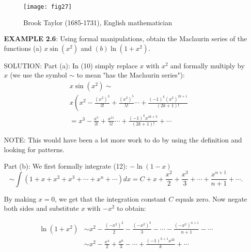 \documentclass[../main.tex]{subfiles}
\begin{document}
\begin{wrapfigure}{l}{0.35\textwidth}
\texttt{[image: fig27]} 
\caption{Brook Taylor (1685-1731), English mathematician \protect\footnotemark[3]}
\label{fig:fig_2_7}
\end{wrapfigure}

\textbf{EXAMPLE 2.6}: Using formal manipulations, obtain the Maclaurin series of the functions (a) $x \sin \left(x^{2}\right)$ and $(b) \ln \left(1+x^{2}\right)$.
 
SOLUTION: Part (a): In (10) simply replace $x$ with $x^{2}$ and formally multiply by $x$ (we use the symbol $\sim$ to mean "has the Maclaurin series"):
$$
\begin{aligned}
&x \sin \left(x^{2}\right) \sim \\
&x\left(x^{2}-\frac{\left(x^{2}\right)^{3}}{3 !}+\frac{\left(x^{2}\right)^{5}}{5 !} \cdots+\frac{(-1)^{k}\left(x^{2}\right)^{2 k+1}}{(2 k+1) !}\right. \\
&=x^{3}-\frac{x^{7}}{3 !}+\frac{x^{11}}{5 !} \cdots+\frac{(-1)^{k} x^{4 k+3}}{(2 k+1) !}+\cdots
\end{aligned}
$$

\noindent NOTE: This would have been a lot more work to do by using the definition and looking for patterns.

Part (b): We first formally integrate (12): $-\ln (1-x)$
$$
\sim \int\left(1+x+x^{2}+x^{3}+\cdots+x^{n}+\cdots\right) d x=C+x+\frac{x^{2}}{2}+\frac{x^{3}}{3}+\cdots+\frac{x^{n+1}}{n+1}+\cdots .
$$

By making $x=0$, we get that the integration constant $C$ equals zero. Now negate both sides and substitute $x$ with $-x^{2}$ to obtain:

$$
\begin{aligned}
\ln \left(1+x^{2}\right) & \sim x^{2}-\frac{\left(-x^{2}\right)^{2}}{2}-\frac{\left(-x^{2}\right)^{3}}{3}-\cdots-\frac{\left(-x^{2}\right)^{n+1}}{n+1}-\cdots \\
& \sim x^{2}-\frac{x^{4}}{2}+\frac{x^{6}}{3}-\cdots+\frac{(-1)^{k+1} x^{2 k}}{k}+\cdots
\end{aligned}
$$
\end{document}

